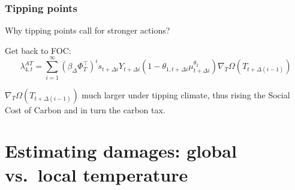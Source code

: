 \documentclass[xcolor=x11names,compress,aspectratio=169]{beamer}%
\makeatletter
\newenvironment{stepitemizewithalert}{\begin{itemize}[<+-| alert@+>]}{\end{itemize} }
\renewenvironment{itemize}{\begin{compactitemize}[<+-| alert@+>]}{\end{compactitemize}}
\renewenvironment{stepitemizewithalert}{\begin{compactitemize}[<+-| alert@+>]}{\end{compactitemize}}
\renewenvironment{stepitemizewithalert}{\begin{itemize}}{\end{itemize}}
\makeatother
\begin{document}
\begin{frame}%
%

\frametitle{Tipping points}%


\begin{stepitemizewithalert}
\item Why tipping points call for stronger actions?%
\vspace{1.5ex}%


\item Get back to FOC:%
\[
\lambda_{4,t}^{AT}=\sum\limits_{i=1}^{\infty}\left(  \beta_{\Delta}\Phi
_{T}^{\top}\right)  ^{i}s_{t+\Delta i}Y_{t+\Delta i}\left(  1-\theta
_{1,t+\Delta i}\mu_{t+\Delta i}^{\theta_{2}}\right)  \nabla_{T}\Omega\left(
T_{t+\Delta\left(  i-1\right)  }\right)
\]%
\vspace{0.5ex}%


\item $\nabla_{T}\Omega\left(  T_{t+\Delta\left(  i-1\right)  }\right)  $ much
larger under tipping climate, thus rising the Social Cost of Carbon and in
turn the carbon tax.
\end{stepitemizewithalert}

%

\transboxout
\end{frame}%


\section{Estimating damages: global vs.\ local temperature}%
\end{document}
